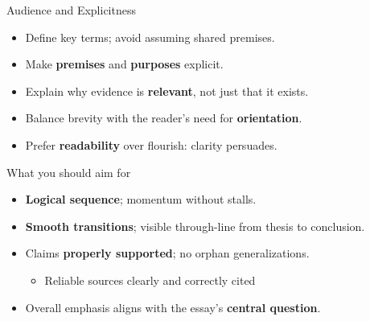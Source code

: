 \documentclass[aspectratio=169]{beamer}
\begin{document}
\begin{frame}{Audience and Explicitness}
\begin{itemize}
  \item Define key terms; avoid assuming shared premises.
  \item Make \textbf{premises} and \textbf{purposes} explicit.
  \item Explain why evidence is \textbf{relevant}, not just that it exists.
  \item Balance brevity with the reader’s need for \textbf{orientation}.
  \item Prefer \textbf{readability} over flourish: clarity persuades.
\end{itemize}
\end{frame}


\begin{frame}{What you should aim for}
\begin{itemize}
  \item \textbf{Logical sequence}; momentum without stalls.
  \item \textbf{Smooth transitions}; visible through-line from thesis to conclusion.
  \item Claims \textbf{properly supported}; no orphan generalizations.
    \begin{itemize}
    \item Reliable sources clearly and correctly  cited
    \end{itemize}
  \item Overall emphasis aligns with the essay’s \textbf{central question}.
\end{itemize}
\end{frame}
\end{document}
